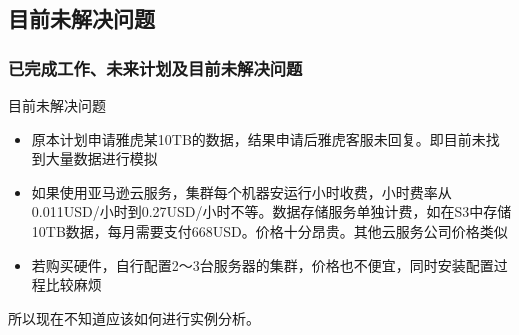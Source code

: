 \documentclass{beamer}
\begin{document}
\subsection{目前未解决问题}
\begin{frame}
	\frametitle{已完成工作、未来计划及目前未解决问题}
		\begin{block}{目前未解决问题}
			\begin{itemize}
				\item 原本计划申请雅虎某10TB的数据，结果申请后雅虎客服未回复。即目前未找到大量数据进行模拟
				\item 如果使用亚马逊云服务，集群每个机器安运行小时收费，小时费率从0.011USD/小时到0.27USD/小时不等。数据存储服务单独计费，如在S3中存储10TB数据，每月需要支付668USD。价格十分昂贵。其他云服务公司价格类似
				\item 若购买硬件，自行配置2～3台服务器的集群，价格也不便宜，同时安装配置过程比较麻烦
			\end{itemize}
			所以现在不知道应该如何进行实例分析。
		\end{block}
\end{frame}
\end{document}
